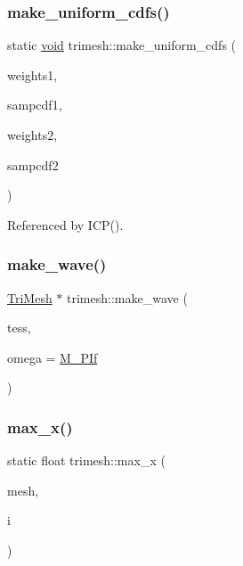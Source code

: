 \mbox{\label{namespacetrimesh_ac54c202ca56dcc7087c6a2607cad912e}} 
\subsubsection{\texorpdfstring{make\+\_\+uniform\+\_\+cdfs()}{make\_uniform\_cdfs()}}
{\footnotesize\ttfamily static \hyperlink{namespacetrimesh_a784ddfd979e1c579bda795a8edfc3f43}{void} trimesh\+::make\+\_\+uniform\+\_\+cdfs (\begin{DoxyParamCaption}\item[{const vector$<$ float $>$ \&}]{weights1,  }\item[{vector$<$ float $>$ \&}]{sampcdf1,  }\item[{const vector$<$ float $>$ \&}]{weights2,  }\item[{vector$<$ float $>$ \&}]{sampcdf2 }\end{DoxyParamCaption})\hspace{0.3cm}{\ttfamily [static]}}



Referenced by I\+C\+P().

\mbox{\label{namespacetrimesh_a5048001851c9e8a3d6ce04c083f1b7e7}} 
\subsubsection{\texorpdfstring{make\+\_\+wave()}{make\_wave()}}
{\footnotesize\ttfamily \hyperlink{classtrimesh_1_1TriMesh}{Tri\+Mesh} $\ast$ trimesh\+::make\+\_\+wave (\begin{DoxyParamCaption}\item[{int}]{tess,  }\item[{float}]{omega = {\ttfamily \hyperlink{mathutil_8h_acbb42dc053fedc161079f0a4d20a64e8}{M\+\_\+\+P\+If}} }\end{DoxyParamCaption})}

\mbox{\label{namespacetrimesh_a284b2c4f188919bba4e78de982c9826a}} 
\subsubsection{\texorpdfstring{max\+\_\+x()}{max\_x()}}
{\footnotesize\ttfamily static float trimesh\+::max\+\_\+x (\begin{DoxyParamCaption}\item[{const \hyperlink{classtrimesh_1_1TriMesh}{Tri\+Mesh} $\ast$}]{mesh,  }\item[{int}]{i }\end{DoxyParamCaption})\hspace{0.3cm}{\ttfamily [static]}}




